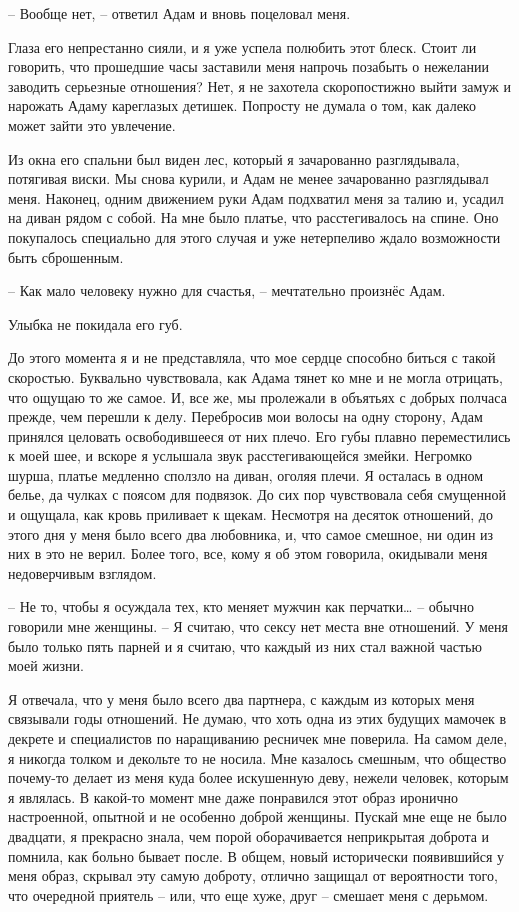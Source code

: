 \documentclass[
]{book}
\begin{document}
-- Вообще нет, -- ответил Адам и вновь поцеловал меня.

Глаза его непрестанно сияли, и я уже успела полюбить этот блеск. Стоит ли говорить, что прошедшие часы заставили меня напрочь позабыть о нежелании заводить серьезные отношения? Нет, я не захотела скоропостижно выйти замуж и нарожать Адаму кареглазых детишек. Попросту не думала о том, как далеко может зайти это увлечение.

Из окна его спальни был виден лес, который я зачарованно разглядывала, потягивая виски. Мы снова курили, и Адам не менее зачарованно разглядывал меня. Наконец, одним движением руки Адам подхватил меня за талию и, усадил на диван рядом с собой. На мне было платье, что расстегивалось на спине. Оно покупалось специально для этого случая и уже нетерпеливо ждало возможности быть сброшенным.

-- Как мало человеку нужно для счастья, -- мечтательно произнёс Адам.

Улыбка не покидала его губ.

До этого момента я и не представляла, что мое сердце способно биться с такой скоростью. Буквально чувствовала, как Адама тянет ко мне и не могла отрицать, что ощущаю то же самое. И, все же, мы пролежали в объятьях с добрых полчаса прежде, чем перешли к делу. Перебросив мои волосы на одну сторону, Адам принялся целовать освободившееся от них плечо. Его губы плавно переместились к моей шее, и вскоре я услышала звук расстегивающейся змейки. Негромко шурша, платье медленно сползло на диван, оголяя плечи. Я осталась в одном белье, да чулках с поясом для подвязок. До сих пор чувствовала себя смущенной и ощущала, как кровь приливает к щекам. Несмотря на десяток отношений, до этого дня у меня было всего два любовника, и, что самое смешное, ни один из них в это не верил. Более того, все, кому я об этом говорила, окидывали меня недоверчивым взглядом.

-- Не то, чтобы я осуждала тех, кто меняет мужчин как перчатки\ldots{} -- обычно говорили мне женщины. -- Я считаю, что сексу нет места вне отношений. У меня было только пять парней и я считаю, что каждый из них стал важной частью моей жизни.

Я отвечала, что у меня было всего два партнера, с каждым из которых меня связывали годы отношений. Не думаю, что хоть одна из этих будущих мамочек в декрете и специалистов по наращиванию ресничек мне поверила. На самом деле, я никогда толком и декольте то не носила. Мне казалось смешным, что общество почему-то делает из меня куда более искушенную деву, нежели человек, которым я являлась. В какой-то момент мне даже понравился этот образ иронично настроенной, опытной и не особенно доброй женщины. Пускай мне еще не было двадцати, я прекрасно знала, чем порой оборачивается неприкрытая доброта и помнила, как больно бывает после. В общем, новый исторически появившийся у меня образ, скрывал эту самую доброту, отлично защищал от вероятности того, что очередной приятель -- или, что еще хуже, друг -- смешает меня с дерьмом.
\end{document}
